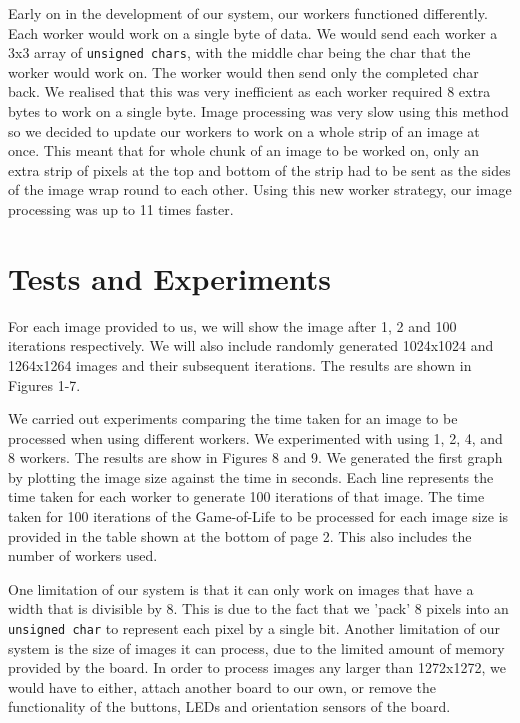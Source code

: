 \documentclass{article}
\begin{document}
\begin{multicols}{2}
\vspace{5mm}

Early on in the development of our system, our workers functioned differently. Each worker would work
on a single byte of data. We would send each worker a 3x3 array of \texttt{unsigned chars}, with the middle
char being the char that the worker would work on. The worker would then send only the completed
char back. We realised that this was very inefficient as each worker required 8 extra bytes to work
on a single byte. Image processing was very slow using this method so we decided to update
our workers to work on a whole strip of an image at once. This meant that for whole chunk of an image
to be worked on, only an extra strip of pixels at the top and bottom of the strip had to be sent as
the sides of the image wrap round to each other. Using this new worker strategy, our image processing
was up to 11 times faster.

\section{Tests and Experiments}
For each image provided to us, we will show the image after 1, 2 and 100
iterations respectively. We will also include randomly generated 1024x1024 and 1264x1264 images and their
subsequent iterations. The results are shown in Figures 1-7.

\vspace{5mm}

We carried out experiments comparing the time taken for an image to be processed when using different
workers. We experimented with using 1, 2, 4, and 8 workers. The results are show in Figures 8 and 9. We
generated the first graph by plotting the image size against the time in seconds. Each line represents the
time taken for each worker to generate 100 iterations of that image. The time taken for 100 iterations of
the Game-of-Life to be processed for each image size is provided in the table shown at the bottom of page
2. This also includes the number of workers used.

\vspace{5mm}

One limitation of our system is that it can only work on images that have a width that is divisible by
8. This is due to the fact that we 'pack' 8 pixels into an \texttt{unsigned char} to represent each pixel by
a single bit. Another limitation of our system is the size of images it can process, due to the limited
amount of memory provided by the board. In order to process images any larger than 1272x1272, we would
have to either, attach another board to our own, or remove the functionality of the buttons, LEDs and
orientation sensors of the board.

\end{multicols}
\end{document}
